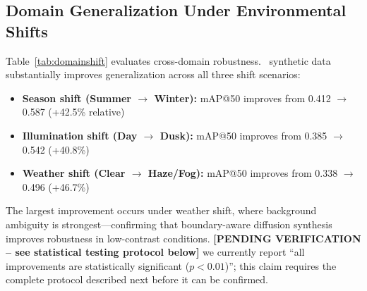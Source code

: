 \documentclass[journal]{IEEEtran}
\begin{document}
\subsection{Domain Generalization Under Environmental Shifts}

Table~\ref{tab:domainshift} evaluates cross-domain robustness. \method~synthetic data substantially improves generalization across all three shift scenarios:

\begin{itemize}
    \item \textbf{Season shift (Summer $\rightarrow$ Winter):} mAP@50 improves from 0.412 $\rightarrow$ 0.587 (+42.5\% relative)
    \item \textbf{Illumination shift (Day $\rightarrow$ Dusk):} mAP@50 improves from 0.385 $\rightarrow$ 0.542 (+40.8\%)
    \item \textbf{Weather shift (Clear $\rightarrow$ Haze/Fog):} mAP@50 improves from 0.338 $\rightarrow$ 0.496 (+46.7\%)
\end{itemize}

The largest improvement occurs under weather shift, where background ambiguity is strongest—confirming that boundary-aware diffusion synthesis improves robustness in low-contrast conditions. \textbf{[PENDING VERIFICATION -- see statistical testing protocol below]} we currently report ``all improvements are statistically significant ($p<0.01$)''; this claim requires the complete protocol described next before it can be confirmed.
\end{document}
